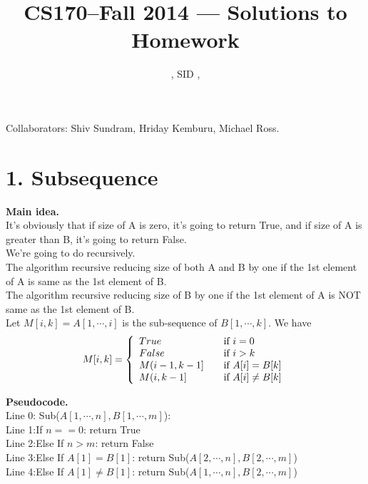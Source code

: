 \documentclass[11pt]{article}
\title{CS170--Fall 2014 --- Solutions to Homework \Homework}
\author{\Name, SID \SID, \texttt{\Login}}
\newcommand{\tab}{\hspace*{2em}}
\begin{document}
\maketitle

\noindent
Collaborators: Shiv Sundram, Hriday Kemburu, Michael Ross.


\section*{1. Subsequence}
\noindent
\textbf{Main idea.}\\
It's obviously that if size of A is zero, it's going to return True, and if size of A is greater than B, it's going to return False.\\
We're going to do recursively.\\
The algorithm recursive reducing size of both A and B by one if the 1st element of A is same as the 1st element of B.\\
The algorithm recursive reducing size of  B by one if the 1st element of A is NOT same as the 1st element of B.\\
Let $M[i,k] = A[1,\cdots, i]$ is the sub-sequence of $B[1,\cdots,k]$. We have
\[ M[i,k] = \left\{ 
  \begin{array}{l l}
    True & \quad \text{if $i = 0$}\\
    False & \quad \text{if $i > k$ }\\
    M(i-1, k -1] & \quad \text{if $A[i] = B[k]$}\\
    M(i, k -1] & \quad \text{if $A[i] \neq B[k]$}\\
  \end{array} \right.\]


\noindent
\textbf{Pseudocode.}\\
Line 0: Sub($A[1,\cdots, n], B[1,\cdots, m]$):\\
Line 1:\tab If $n == 0$: return True\\
Line 2:\tab Else If $n > m$: return False\\
Line 3:\tab Else If $A[1] = B[1]$: return Sub($A[2,\cdots, n], B[2,\cdots, m]$)\\
Line 4:\tab Else If $A[1] \neq B[1]$: return Sub($A[1,\cdots, n], B[2,\cdots, m]$)\\
\end{document}
